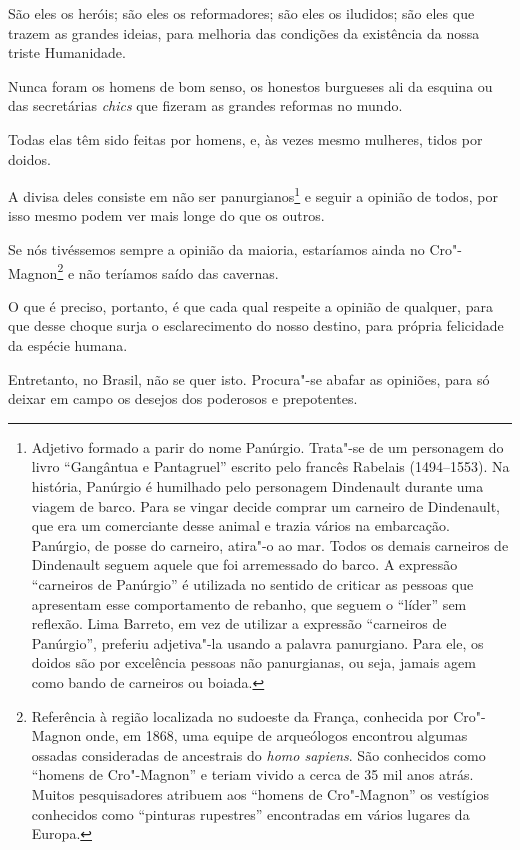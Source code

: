 São eles os heróis; são eles os reformadores; são eles os iludidos; são
eles que trazem as grandes ideias, para melhoria das condições da
existência da nossa triste Humanidade.

Nunca foram os homens de bom senso, os honestos burgueses ali da esquina
ou das secretárias \emph{chics} que fizeram as grandes reformas no
mundo.

Todas elas têm sido feitas por homens, e, às vezes
mesmo mulheres, tidos por doidos.

A divisa deles consiste em não ser panurgianos\footnote{Adjetivo formado
  a parir do nome Panúrgio. Trata"-se de um personagem do livro
  ``Gangântua e Pantagruel'' escrito pelo francês Rabelais (1494--1553). Na história, Panúrgio é humilhado pelo personagem Dindenault
  durante uma viagem de barco. Para se vingar decide comprar um carneiro
  de Dindenault, que era um comerciante desse animal e trazia vários na
  embarcação. Panúrgio, de posse do carneiro, atira"-o ao mar. Todos os
  demais carneiros de Dindenault seguem aquele que foi arremessado do
  barco. A expressão ``carneiros de Panúrgio'' é utilizada no sentido de
  criticar as pessoas que apresentam esse comportamento de rebanho, que
  seguem o ``líder'' sem reflexão. Lima Barreto, em vez de utilizar a
  expressão ``carneiros de Panúrgio'', preferiu adjetiva"-la usando a
  palavra panurgiano. Para ele, os doidos são por excelência pessoas não
  panurgianas, ou seja, jamais agem como bando de carneiros ou boiada.}
e seguir a opinião de todos, por isso mesmo podem ver mais longe do que
os outros.

Se nós tivéssemos sempre a opinião da maioria, estaríamos ainda no
Cro"-Magnon\footnote{Referência à região localizada no sudoeste da
  França, conhecida por Cro"-Magnon onde, em 1868, uma equipe de
  arqueólogos encontrou algumas ossadas consideradas de ancestrais do
  \emph{homo sapiens}. São conhecidos como ``homens de Cro"-Magnon'' e
  teriam vivido a cerca de 35 mil anos atrás. Muitos pesquisadores
  atribuem aos ``homens de Cro"-Magnon'' os vestígios conhecidos como
  ``pinturas rupestres'' encontradas em vários lugares da Europa.} e não
teríamos saído das cavernas.

O que é preciso, portanto, é que cada qual respeite a opinião de
qualquer, para que desse choque surja o esclarecimento do nosso destino,
para própria felicidade da espécie humana.

Entretanto, no Brasil, não se quer isto. Procura"-se abafar as opiniões,
para só deixar em campo os desejos dos poderosos e prepotentes.

